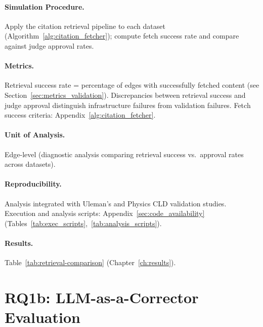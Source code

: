 \paragraph{Simulation Procedure.}
Apply the citation retrieval pipeline to each dataset (Algorithm~\ref{alg:citation_fetcher}); compute fetch success rate and compare against judge approval rates.

\paragraph{Metrics.}
Retrieval success rate = percentage of edges with successfully fetched content (see Section~\ref{sec:metrics_validation}). Discrepancies between retrieval success and judge approval distinguish infrastructure failures from validation failures. Fetch success criteria: Appendix~\ref{alg:citation_fetcher}.

\paragraph{Unit of Analysis.}
Edge-level (diagnostic analysis comparing retrieval success vs.\ approval rates across datasets).

\paragraph{Reproducibility.}
Analysis integrated with Uleman's and Physics CLD validation studies. Execution and analysis scripts: Appendix~\ref{sec:code_availability} (Tables~\ref{tab:exec_scripts},~\ref{tab:analysis_scripts}).

\paragraph{Results.}
Table~\ref{tab:retrieval-comparison} (Chapter~\ref{ch:results}).

\section{RQ1b: LLM-as-a-Corrector Evaluation}
\label{sec:rq1b}
\label{sec:rq1b_experiments}


